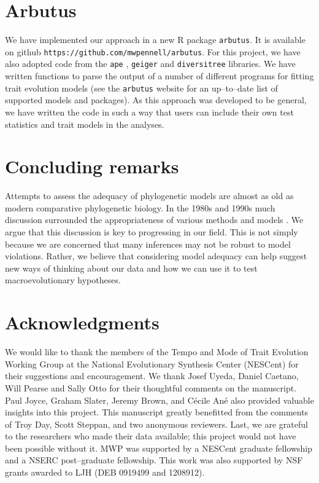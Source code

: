 \documentclass[a4paper,11pt]{article}
\begin{document}
\section{Arbutus}

We have implemented our approach in a new R package \texttt{arbutus}. It is available on github \texttt{https://github.com/mwpennell/arbutus}. For this project, we have also adopted code from the \texttt{ape} \citep{ape}, \texttt{geiger} \citep{geiger2} and \texttt{diversitree} \citep{FitzJohn2012} libraries. We have written functions to parse the output of a number of different programs for fitting trait evolution models (see the \texttt{arbutus} website for an up--to--date list of supported models and packages). As this approach was developed to be general, we have written the code in such a way that users can include their own test statistics and trait models in the analyses.

\section{Concluding remarks}
Attempts to assess the adequacy of phylogenetic models are almost as old as modern comparative phylogenetic biology. In the 1980s and 1990s much discussion surrounded the appropriateness of various methods and models \citep{Felsenstein1985, Felsenstein1988, HarveyPagel1991, Garland1992, Diaz1996, Price1997, Garland1999, GarlandIves2000}. We argue that this discussion is key to progressing in our field. This is not simply because we are concerned that many inferences may not be robust to model violations. Rather, we believe that considering model adequacy can help suggest new ways of thinking about our data and how we can use it to test macroevolutionary hypotheses.


\section{Acknowledgments}
We would like to thank the members of the Tempo and Mode of Trait Evolution Working Group at the National Evolutionary Synthesis Center (NESCent) for their suggestions and encouragement. We thank Josef Uyeda, Daniel Caetano, Will Pearse and Sally Otto for their thoughtful comments on the manuscript. Paul Joyce, Graham Slater, Jeremy Brown, and C\'{e}cile An\'{e} also provided valuable insights into this project. This manuscript greatly benefitted from the comments of Troy Day, Scott Steppan, and two anonymous reviewers. Last, we are grateful to the researchers who made their data available; this project would not have been possible without it. MWP was supported by a NESCent graduate fellowship and a NSERC post--graduate fellowship. This work was also supported by NSF grants awarded to LJH (DEB 0919499 and 1208912).
\end{document}
